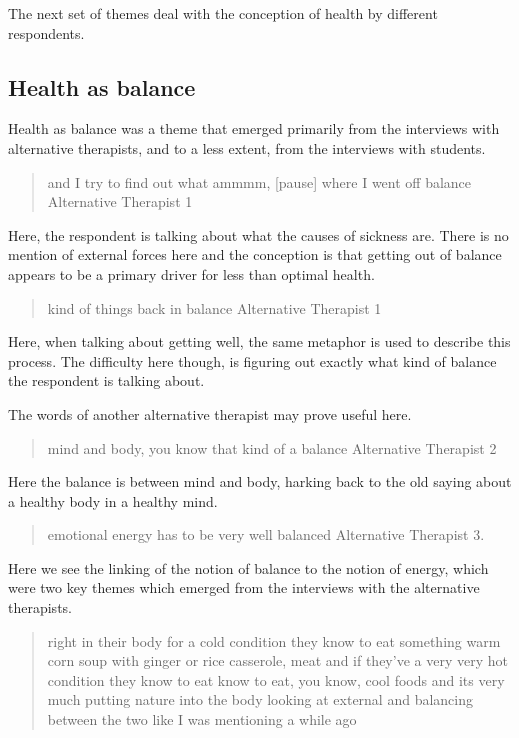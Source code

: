 The next set of themes deal with the conception of health by different respondents. 

\subsection{Health as balance}
\label{sec:health-as-balance}

Health as balance was a theme that emerged primarily from the interviews with alternative therapists, and to a less extent, from the interviews with students. 

\begin{quotation}
  and I try to find out what ammmm, [pause] where I went off balance 
Alternative Therapist 1
\end{quotation}

Here, the respondent is talking about what the causes of sickness are. There is no mention of external forces here and the conception is that getting out of balance appears to be a primary driver for less than optimal health. 

\begin{quotation}
  kind of things back in balance
Alternative Therapist 1
\end{quotation}

Here, when talking about getting well, the same metaphor is used to describe this process. The difficulty here though, is figuring out exactly what kind of balance the respondent is talking about. 

The words of another alternative therapist may prove useful here. 
\begin{quotation}
  mind and body, you know that kind of a balance 
Alternative Therapist 2
\end{quotation}

Here the balance is between mind and body, harking back to the old saying about a healthy body in a healthy mind. 


\begin{quotation}
  emotional energy has to be very well balanced
Alternative Therapist 3.
\end{quotation}

Here we see the linking of the notion of balance to the notion of energy, which were two key themes which emerged from the interviews with the alternative therapists. 

\begin{quotation}
  right in their body for a cold condition they know to eat something warm corn soup with ginger or rice casserole, meat and if they've a very very hot condition they know to eat know to eat, you know, cool foods and its very much putting nature into the body looking at external and balancing between the two like I was mentioning a while ago

\end{quotation}

